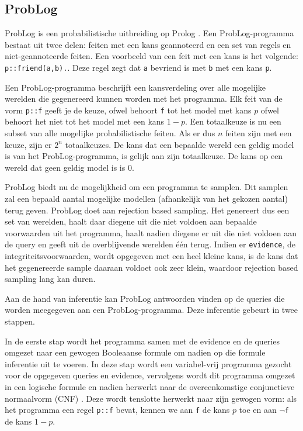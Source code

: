 \documentclass{article}
\begin{document}
	\subsection{ProbLog}
	ProbLog is een probabilistische uitbreiding op Prolog \cite{raedt07problog}. Een ProbLog-programma bestaat uit twee delen: feiten met een kans geannoteerd en een set van regels en niet-geannoteerde feiten. Een voorbeeld van een feit met een kans is het volgende: \texttt{p::friend(a,b).}. Deze regel zegt dat \texttt{a} bevriend is met \texttt{b} met een kans \texttt{p}.

Een ProbLog-programma beschrijft een kansverdeling over alle mogelijke werelden die gegenereerd kunnen worden met het programma. Elk feit van de vorm \texttt{p::f} geeft je de keuze, ofwel behoort \texttt{f} tot het model met kans $p$ ofwel behoort het niet tot het model met een kans $1-p$. Een totaalkeuze is nu een subset van alle mogelijke probabilistische feiten. Als er dus $n$ feiten zijn met een keuze, zijn er $2^n$ totaalkeuzes. De kans dat een bepaalde wereld een geldig model is van het ProbLog-programma, is gelijk aan zijn totaalkeuze. De kans op een wereld dat geen geldig model is is $0$.

ProbLog biedt nu de mogelijkheid om een programma te samplen. Dit samplen zal een bepaald aantal mogelijke modellen (afhankelijk van het gekozen aantal) terug geven. ProbLog doet aan rejection based sampling. Het genereert dus een set van werelden, haalt daar diegene uit die niet voldoen aan bepaalde voorwaarden uit het programma, haalt nadien diegene er uit die niet voldoen aan de query en geeft uit de overblijvende werelden \'e\'en terug. Indien er \texttt{evidence}, de integriteitsvoorwaarden, wordt opgegeven met een heel kleine kans, is de kans dat het gegenereerde sample daaraan voldoet ook zeer klein, waardoor rejection based sampling lang kan duren.

Aan de hand van inferentie kan ProbLog antwoorden vinden op de queries die worden meegegeven aan een ProbLog-programma. Deze inferentie gebeurt in twee stappen.

In de eerste stap wordt het programma samen met de evidence en de queries omgezet naar een gewogen Booleaanse formule om nadien op die formule inferentie uit te voeren. In deze stap wordt een variabel-vrij programma gezocht voor de opgegeven queries en evidence, vervolgens wordt dit programma omgezet in een logische formule en nadien herwerkt naar de overeenkomstige conjunctieve normaalvorm (CNF) \cite{cnf}. Deze wordt tenslotte herwerkt naar zijn gewogen vorm: als het programma een regel \texttt{p::f} bevat, kennen we aan \texttt{f} de kans $p$ toe en aan \texttt{$\neg$f} de kans $1-p$.
\end{document}
